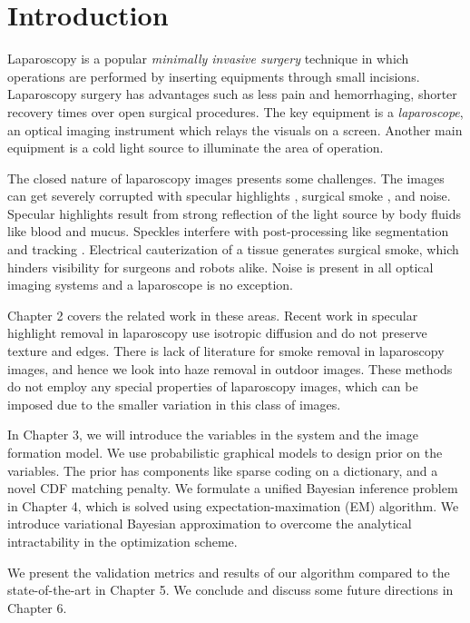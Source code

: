 
\newcommand{\etas}{\ensuremath{\eta_{\mathrm{s}}}}


\chapter{Introduction}

Laparoscopy is a popular \emph{minimally invasive surgery} technique in which operations are performed by inserting equipments through small incisions. Laparoscopy surgery has advantages such as less pain and hemorrhaging, shorter recovery times over open surgical procedures. The key equipment is a \emph{laparoscope}, an optical imaging instrument which relays the visuals on a screen. Another main equipment is a cold light source to illuminate the area of operation.

The closed nature of laparoscopy images presents some challenges. The images can get severely corrupted with specular highlights \cite{stoyanov2005removing, saint2011detection}, surgical smoke \cite{barrett2003surgical}, and noise. Specular highlights result from strong reflection of the light source by body fluids like blood and mucus. Speckles interfere with post-processing like segmentation \cite{prokopetc2015segmentation, voros2007segmentation} and tracking \cite{wolf2011tracking}. Electrical cauterization of a tissue generates surgical smoke, which hinders visibility for surgeons and robots alike. Noise is present in all optical imaging systems and a laparoscope is no exception.

Chapter 2 covers the related work in these areas. Recent work in specular highlight removal in laparoscopy use isotropic diffusion and do not preserve texture and edges. There is lack of literature for smoke removal in laparoscopy images, and hence we look into haze removal in outdoor images. These methods do not employ any special properties of laparoscopy images, which can be imposed due to the smaller variation in this class of images.

In Chapter 3, we will introduce the variables in the system and the image formation model. We use probabilistic graphical models to design prior on the variables. The prior has components like sparse coding on a dictionary, and a novel CDF matching penalty. We formulate a unified Bayesian inference problem in Chapter 4, which is solved using expectation-maximation (EM) algorithm. We introduce variational Bayesian approximation to overcome the analytical intractability in the optimization scheme. 

We present the validation metrics and results of our algorithm compared to the state-of-the-art in Chapter 5. We conclude and discuss some future directions in Chapter 6.







